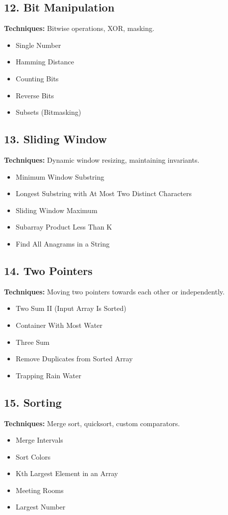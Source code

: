 \documentclass{article}
\begin{document}
\subsection*{12. Bit Manipulation}
\textbf{Techniques:} Bitwise operations, XOR, masking.
\begin{itemize}[noitemsep]
    \item Single Number
    \item Hamming Distance
    \item Counting Bits
    \item Reverse Bits
    \item Subsets (Bitmasking)
\end{itemize}

\subsection*{13. Sliding Window}
\textbf{Techniques:} Dynamic window resizing, maintaining invariants.
\begin{itemize}[noitemsep]
    \item Minimum Window Substring
    \item Longest Substring with At Most Two Distinct Characters
    \item Sliding Window Maximum
    \item Subarray Product Less Than K
    \item Find All Anagrams in a String
\end{itemize}

\subsection*{14. Two Pointers}
\textbf{Techniques:} Moving two pointers towards each other or independently.
\begin{itemize}[noitemsep]
    \item Two Sum II (Input Array Is Sorted)
    \item Container With Most Water
    \item Three Sum
    \item Remove Duplicates from Sorted Array
    \item Trapping Rain Water
\end{itemize}

\subsection*{15. Sorting}
\textbf{Techniques:} Merge sort, quicksort, custom comparators.
\begin{itemize}[noitemsep]
    \item Merge Intervals
    \item Sort Colors
    \item Kth Largest Element in an Array
    \item Meeting Rooms
    \item Largest Number
\end{itemize}
\end{document}
